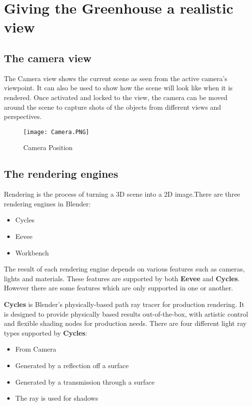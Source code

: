 \documentclass{article}
\begin{document}
\section{Giving the Greenhouse a realistic view}
\subsection{The camera view}
The Camera view shows the current scene as seen from the active camera’s viewpoint. It can also be used to show how the scene will look like when it is rendered. Once activated and locked to the view, the camera can be moved around the scene to capture shots of the objects from different views and perspectives.
\newline

\begin{figure}[htp]
    \centering
    \texttt{[image: Camera.PNG]}
    \caption{Camera Position}
\end{figure}

\subsection{The rendering engines}
Rendering is the process of turning a 3D scene into a 2D image.There are three rendering engines in Blender:
\begin{itemize}
\item Cycles
\item Eevee
\item Workbench
\end{itemize}
The result of each rendering engine depends on various features such as  cameras, lights and materials. These features are supported by both \textbf{Eevee} and \textbf{Cycles}. However there are some features which are only supported in one or another.
\newline
\par\textbf{Cycles} is Blender’s physically-based path ray tracer for production rendering. It is designed to provide physically based results out-of-the-box, with artistic control and flexible shading nodes for production needs.
There are four different light ray types supported by \textbf{Cycles}:
\begin{itemize}
\item From Camera
\item Generated by a reflection off a surface
\item Generated by a transmission through a surface
\item The ray is used for shadows
\end{itemize} \par
  
\end{document}
